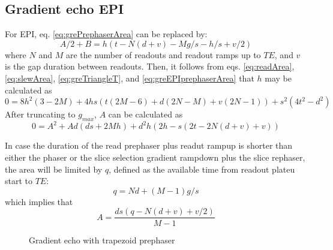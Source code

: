 \documentclass{article}
\begin{document}
\subsection{Gradient echo EPI}
For EPI, eq. \ref{eq:grePrephaserArea} can be replaced by:
\begin{equation}
    A/2 + B = h(t-N(d+v)-Mg/s-h/s+v/2)
    \label{eq:greEPIprephaserArea}
\end{equation}
where $N$ and $M$ are the number of readouts and readout ramps up to $TE$, and $v$ is the gap duration between readouts. 
Then, it follows from eqs. \ref{eq:readArea}, \ref{eq:slewArea}, \ref{eq:greTriangleT}, and \ref{eq:greEPIprephaserArea} that $h$ may be calculated as
\begin{equation}
    0 = 8h^2(3-2M) + 4 hs (t(2M-6)+d(2N-M)+v(2N-1)) + s^2(4t^2-d^2)
    \label{eq:GREEPIprephaserAmp}
\end{equation}
After truncating to $g_{max}$, $A$ can be calculated as
\begin{equation}
    0 = A^2 + Ad(ds+2Mh) + d^2h(2h-s(2t-2N(d+v)+v))
    \label{eq:greEPIArea}
\end{equation}

In case the duration of the read prephaser plus readut rampup is shorter than either the phaser or the slice selection gradient rampdown plus the slice rephaser, the area will be limited by $q$, defined as the available time from readout plateu start to $TE$:
\begin{equation}
    q = Nd + (M-1) g/s
    \label{eq:q}
\end{equation}
which implies that
\begin{equation}
    A = \frac{ds(q - N(d+v) + v/2)}{M-1}
    \label{eq:qArea}
\end{equation}

\begin{figure}
    \centering
    \caption{Gradient echo with trapezoid prephaser}
    \label{fig:gre}
\end{figure}
\end{document}
